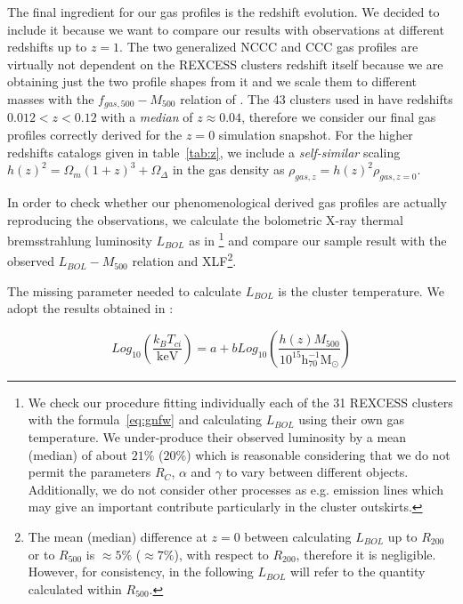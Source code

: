 \documentclass[traditabstract]{aa}
\newcommand{\rmn}{\mathrm}
\begin{document}
The final ingredient for our gas profiles is the redshift evolution. We decided to include it because we want to compare our results with observations at different redshifts up to $z=1$. The two generalized NCCC and CCC gas profiles are virtually not dependent on the REXCESS clusters redshift itself because we are obtaining just the two profile shapes from it and we scale them to different masses with the $f_{gas,500}-M_{500}$ relation of \cite{2009ApJ...693.1142S}. The 43 clusters used in \cite{2009ApJ...693.1142S} have redshifts $0.012 < z < 0.12$ with a \emph{median} of $z \approx 0.04$, therefore we consider our final gas profiles correctly derived for the $z = 0$ simulation snapshot. For the higher redshifts catalogs given in table~\ref{tab:z}, we include a \emph{self-similar} scaling $h(z)^{2} = \Omega_{m} (1+z)^{3} + \Omega_{\Delta}$ in the gas density as $\rho_{gas,z} = h(z)^{2} \rho_{gas,z=0}$.

In order to check whether our phenomenological derived gas profiles are actually reproducing the observations, we calculate the bolometric X-ray thermal bremsstrahlung luminosity $L_{BOL}$ as in \cite{1988xrec.book.....S}\footnote[5]{We check our procedure fitting individually each of the 31 REXCESS clusters with the formula~\ref{eq:gnfw} and calculating $L_{BOL}$ using their own gas temperature. We under-produce their observed luminosity by a mean (median) of about $21\%$ ($20\%$) which is reasonable considering that we do not permit the parameters $R_{C}$, $\alpha$ and $\gamma$ to vary between different objects. Additionally, we do not consider other processes as e.g. emission lines which may give an important contribute particularly in the cluster outskirts.} and compare our sample result with the observed $L_{BOL} - M_{500}$ relation and XLF\footnote[6]{The mean (median) difference at $z=0$ between calculating $L_{BOL}$ up to $R_{200}$ or to $R_{500}$ is $\approx 5\%$ ($\approx 7\%$), with respect to $R_{200}$, therefore it is negligible. However, for consistency, in the following $L_{BOL}$ will refer to the quantity calculated within $R_{500}$.}. 

The missing parameter needed to calculate $L_{BOL}$ is the cluster temperature. We adopt the results obtained in \cite{2010MNRAS.406.1773M}:

\begin{equation}
Log_{10} \left( \frac{k_{B}T_{ci}}{\rmn{keV}} \right) = a + b Log_{10} \left( \frac{h(z)M_{500}}{10^{15} \rmn{h}_{70}^{-1} \rmn{M_{\odot}}} \right)
\label{eq:temp}
\end{equation}
 
\end{document}
